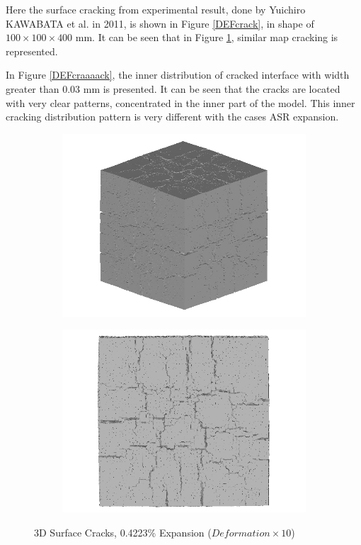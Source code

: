 Here the surface cracking from experimental result, done by Yuichiro KAWABATA et al\cite{KAWABATA}. in 2011, is shown in Figure \ref{DEFcrack}, in shape of $100 \times 100 \times 400$ mm.
It can be seen that in Figure \ref{fig:DEF_A30X0C_3_3D}, similar map cracking is represented.


In Figure \ref{DEFcraaaack}, the inner distribution of cracked interface with width greater than 0.03 mm is presented. It can be seen that the cracks are located with very clear patterns, concentrated in the inner part of the model. This inner cracking distribution pattern is very different with the cases ASR expansion.

  \begin{figure}[ht!]
  \centering
      \begin{subfigure}{.5\textwidth}
        \centering
        \includegraphics[width=.8\linewidth]{Files/exp_3D/DEF/A30X0C_3_3d.png}
      \end{subfigure}%
      \begin{subfigure}{.5\textwidth}
        \centering
        \includegraphics[width=.8\linewidth]{Files/exp_3D/DEF/A30X0C_3_3ds.png}
        \end{subfigure}
    \caption{3D Surface Cracks, 0.4223\% Expansion ($Deformation \times 10$)}
    \label{fig:DEF_A30X0C_3_3D}
  \end{figure}

